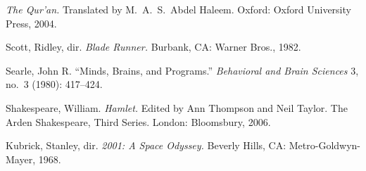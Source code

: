 \documentclass[11pt]{article}
\begin{document}
\begin{description}[leftmargin=2em, style=unboxed, itemsep=0.35em]
\item[] \emph{The Qur'an.} Translated by M.\ A.\ S.\ Abdel Haleem. Oxford: Oxford University Press, 2004.

\item[] Scott, Ridley, dir. \emph{Blade Runner.} Burbank, CA: Warner Bros., 1982.

\item[] Searle, John R. \enquote{Minds, Brains, and Programs.} \emph{Behavioral and Brain Sciences} 3, no.\ 3 (1980): 417--424.

\item[] Shakespeare, William. \emph{Hamlet.} Edited by Ann Thompson and Neil Taylor. The Arden Shakespeare, Third Series. London: Bloomsbury, 2006.

\item[] Kubrick, Stanley, dir. \emph{2001: A Space Odyssey.} Beverly Hills, CA: Metro-Goldwyn-Mayer, 1968.

\end{description}
\end{document}
